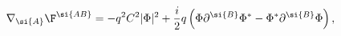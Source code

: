 \begin{equation}\label{eq:max}
\nabla_{\si{A}}
\F^{\si{AB}}=-q^2C^2\vert\Phi\vert^2+\frac{i}{2}q\left(
\Phi\partial^{\si{B}}\Phi^*-\Phi^*\partial^{\si{B}}\Phi\right),
\end{equation}

